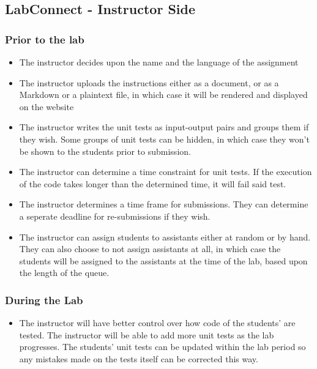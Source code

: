 \documentclass[a4paper, 12pt]{article}
\begin{document}
    \subsection{LabConnect - Instructor Side}

    \subsubsection{Prior to the lab}
    \begin{itemize}
        \item The instructor decides upon the name and the language of the assignment
        \item The instructor uploads the instructions either as a document, or as a Markdown
          or a plaintext file, in which case it will be rendered and displayed on the website
        \item The instructor writes the unit tests as input-output pairs and groups them if
          they wish. Some groups of unit tests can be hidden, in which case they won't be
          shown to the students prior to submission.
        \item The instructor can determine a time constraint for unit tests. If the execution
          of the code takes longer than the determined time, it will fail said test.
        \item The instructor determines a time frame for submissions. They can determine a
          seperate deadline for re-submissions if they wish.
        \item The instructor can assign students to assistants either at random or by hand.
          They can also choose to not assign assistants at all, in which case the students
          will be assigned to the assistants at the time of the lab, based upon the length
          of the queue.        
    \end{itemize}
    
    \subsubsection{During the Lab}
    \begin{itemize}
        \item The instructor will have better control over how code of the students' are tested.
        The instructor will be able to add more unit tests as the lab progresses. 
        The students' unit tests can be updated within the lab period so any mistakes made
        on the tests itself can be corrected this way.
    \end{itemize}
\end{document}

